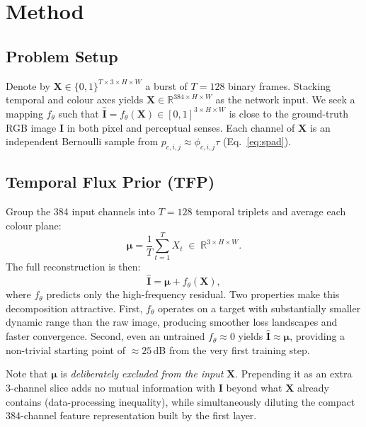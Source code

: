 \documentclass[10pt,twocolumn,letterpaper]{article}
\newcommand{\Real}{\mathbb{R}}
\newcommand{\Xhat}{\hat{\mathbf{I}}}
\newcommand{\Igt}{\mathbf{I}}
\newcommand{\vX}{\mathbf{X}}
\newcommand{\bmu}{\boldsymbol{\mu}}
\begin{document}
\section{Method}

\subsection{Problem Setup}

Denote by $\vX \in \{0,1\}^{T\times3\times H\times W}$ a burst of
$T{=}128$ binary frames.  Stacking temporal and colour axes yields
$\vX \in \Real^{384\times H\times W}$ as the network input.
We seek a mapping $f_\theta$ such that
$\Xhat{=}f_\theta(\vX) \in [0,1]^{3\times H\times W}$ is close to
the ground-truth RGB image $\Igt$ in both pixel and perceptual
senses.  Each channel of $\vX$ is an independent Bernoulli sample
from $p_{c,i,j}\approx\phi_{c,i,j}\tau$ (Eq.~\ref{eq:spad}).

\subsection{Temporal Flux Prior (TFP)}

Group the 384 input channels into $T{=}128$ temporal triplets and
average each colour plane:
\begin{equation}
  \bmu = \frac{1}{T}\sum_{t=1}^{T} X_t \;\in\; \Real^{3\times H\times W}.
  \label{eq:tfp}
\end{equation}
The full reconstruction is then:
\begin{equation}
  \Xhat = \bmu + f_\theta(\vX),
  \label{eq:residual}
\end{equation}
where $f_\theta$ predicts only the high-frequency residual.
Two properties make this decomposition attractive.
First, $f_\theta$ operates on a target with substantially smaller
dynamic range than the raw image, producing smoother loss landscapes
and faster convergence.
Second, even an untrained $f_\theta \approx 0$ yields
$\Xhat \approx \bmu$, providing a non-trivial starting point
of ${\approx}25$\,dB from the very first training step.

Note that $\bmu$ is \emph{deliberately excluded from the input}
$\vX$.  Prepending it as an extra 3-channel slice adds no mutual
information with $\Igt$ beyond what $\vX$ already contains
(data-processing inequality), while simultaneously diluting the
compact 384-channel feature representation built by the first layer.
\end{document}
